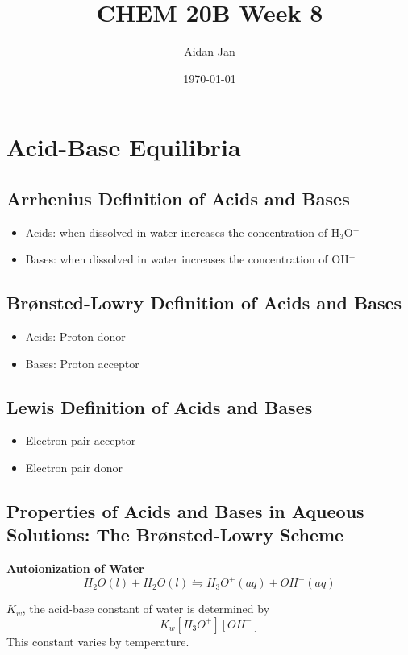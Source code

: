 \documentclass[10pt]{article}
\title{CHEM 20B Week 8}
\author{Aidan Jan}
\date{\today}
\begin{document}
\maketitle
\section*{Acid-Base Equilibria}
\subsection*{Arrhenius Definition of Acids and Bases}
\begin{itemize}
    \item Acids: when dissolved in water increases the concentration of H$_3$O$^+$
    \item Bases: when dissolved in water increases the concentration of OH$^-$
\end{itemize}

\subsection*{Brønsted-Lowry Definition of Acids and Bases}
\begin{itemize}
    \item Acids: Proton donor
    \item Bases: Proton acceptor
\end{itemize}

\subsection*{Lewis Definition of Acids and Bases}
\begin{itemize}
    \item Electron pair acceptor
    \item Electron pair donor
\end{itemize}

\subsection*{Properties of Acids and Bases in Aqueous Solutions: The Brønsted-Lowry Scheme}
\textbf{Autoionization of Water}
\[H_2 O(l) + H_2 O(l) \leftrightharpoons H_3O^+(aq) + OH^- (aq)\]

$K_w$, the acid-base constant of water is determined by 
\[K_w[H_3O^+][OH^-]\]
This constant varies by temperature.
\end{document}
